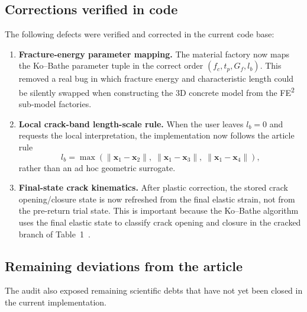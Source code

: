 \subsection{Corrections verified in code}

The following defects were verified and corrected in the current code base:
\begin{enumerate}
  \item \textbf{Fracture-energy parameter mapping.}  The material factory now
    maps the Ko--Bathe parameter tuple in the correct order
    \((f_c, t_p, G_f, l_b)\).  This removed a real bug in which fracture energy
    and characteristic length could be silently swapped when constructing the
    3D concrete model from the FE\textsuperscript{2} sub-model factories.
  \item \textbf{Local crack-band length-scale rule.}  When the user leaves
    \(l_b = 0\) and requests the local interpretation, the implementation now
    follows the article rule
    \[
      l_b
      =
      \max\!\left(
        \lVert \mathbf{x}_1-\mathbf{x}_2\rVert,\;
        \lVert \mathbf{x}_1-\mathbf{x}_3\rVert,\;
        \lVert \mathbf{x}_1-\mathbf{x}_4\rVert
      \right),
    \]
    rather than an ad hoc geometric surrogate.
  \item \textbf{Final-state crack kinematics.}  After plastic correction, the
    stored crack opening/closure state is now refreshed from the final elastic
    strain, not from the pre-return trial state.  This is important because the
    Ko--Bathe algorithm uses the final elastic state to classify crack opening
    and closure in the cracked branch of Table~1~\cite{KoBathe2026}.
\end{enumerate}

\subsection{Remaining deviations from the article}

The audit also exposed remaining scientific debts that have not yet been
closed in the current implementation.

